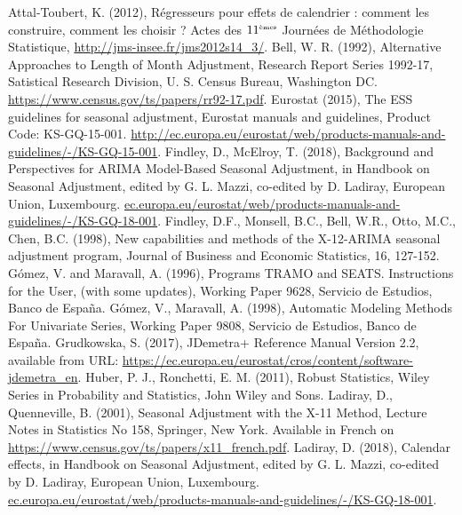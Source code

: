 \documentclass[12pt, a4paper]{article}
\begin{document}
\nocite{*}
\begin{thebibliography}{999}
 Attal-Toubert, K. (2012), Régresseurs pour effets de calendrier : comment les construire, comment les choisir ? Actes des $11^{\mbox{\tiny èmes}}$ Journées de Méthodologie Statistique, \url{http://jms-insee.fr/jms2012s14_3/}.
 Bell, W. R. (1992), Alternative Approaches to Length of Month Adjustment, Research Report Series 1992-17, Satistical Research Division, U. S. Census Bureau, Washington DC. \url{https://www.census.gov/ts/papers/rr92-17.pdf}.
 Eurostat (2015), The ESS guidelines for seasonal adjustment, Eurostat manuals and guidelines, Product Code: KS-GQ-15-001. \url{http://ec.europa.eu/eurostat/web/products-manuals-and-guidelines/-/KS-GQ-15-001}.
 Findley, D., McElroy, T. (2018), Background and Perspectives for ARIMA Model-Based Seasonal Adjustment, in Handbook on Seasonal Adjustment, edited by G. L. Mazzi, co-edited by D. Ladiray, European Union, Luxembourg. \url{ec.europa.eu/eurostat/web/products-manuals-and-guidelines/-/KS-GQ-18-001}.
 Findley, D.F., Monsell, B.C., Bell, W.R., Otto, M.C., Chen, B.C. (1998), New capabilities and methods of the X-12-ARIMA seasonal adjustment program, Journal of Business and Economic Statistics, 16, 127-152.
 G\'{o}mez, V. and Maravall, A. (1996), Programs TRAMO and SEATS. Instructions for the User, (with some updates), Working Paper 9628, Servicio de Estudios, Banco de Espa\~{n}a.
 G\'{o}mez, V., Maravall, A. (1998), Automatic Modeling Methods For Univariate Series, Working Paper 9808, Servicio de Estudios, Banco de Espa\~{n}a.
 	Grudkowska, S. (2017),	JDemetra+ Reference Manual Version 2.2, available from URL: \url{https://ec.europa.eu/eurostat/cros/content/software-jdemetra_en}.
 Huber, P. J., Ronchetti, E. M. (2011), Robust Statistics, Wiley Series in Probability and Statistics, John Wiley and Sons.
 Ladiray, D., Quenneville, B. (2001), Seasonal Adjustment with the X-11 Method, Lecture Notes in Statistics No 158, Springer, New York. Available in French on \url{https://www.census.gov/ts/papers/x11_french.pdf}.
 Ladiray, D. (2018), Calendar effects, in Handbook on Seasonal Adjustment, edited by G. L. Mazzi, co-edited by D. Ladiray, European Union, Luxembourg. \url{ec.europa.eu/eurostat/web/products-manuals-and-guidelines/-/KS-GQ-18-001}.

\end{thebibliography}
\end{document}
